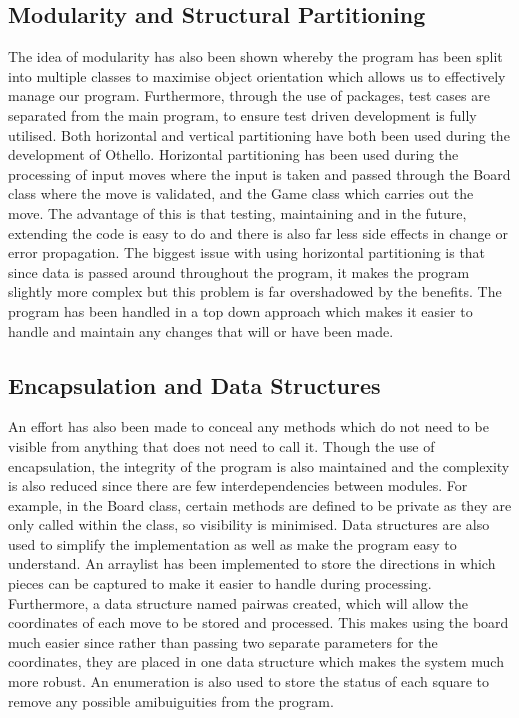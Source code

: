 \documentclass[a4wide, 11pt]{article}
\begin{document}
\subsection{Modularity and Structural Partitioning}
The idea of modularity has also been shown whereby the program has been split into multiple classes to maximise object orientation which allows us to effectively manage our program. Furthermore, through the use of packages, test cases are separated from the main program, to ensure test driven development is fully utilised. Both horizontal and vertical partitioning have both been used during the development of Othello. Horizontal partitioning has been used during the processing of input moves where the input is taken and passed through the Board class where the move is validated, and the Game class which carries out the move. The advantage of this is that testing, maintaining and in the future, extending the code is easy to do and there is also far less side effects in change or error propagation. The biggest issue with using horizontal partitioning is that since data is passed around throughout the program, it makes the program slightly more complex but this problem is far overshadowed by the benefits. The program has been handled in a top down approach which makes it easier to handle and maintain any changes that will or have been made.

\subsection{Encapsulation and Data Structures}
An effort has also been made to conceal any methods which do not need to be visible from anything that does not need to call it. Though the use of encapsulation, the integrity of the program is also maintained and the complexity is also reduced since there are few interdependencies between modules. For example, in the Board class, certain methods are defined to be private as they are only called within the class, so visibility is minimised. Data structures are also used to simplify the implementation as well as make the program easy to understand. An arraylist has been implemented to store the directions in which pieces can be captured to make it easier to handle during processing. Furthermore, a data structure named pairwas created, which will allow the coordinates of each move to be stored and processed. This makes using the board much easier since rather than passing two separate parameters for the coordinates, they are placed in one data structure which makes the system much more robust. An enumeration is also used to store the status of each square to remove any possible amibuiguities from the program.
\end{document}
